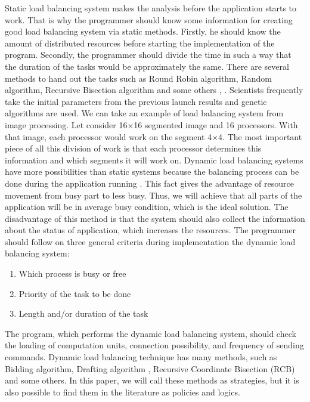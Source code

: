 Static load balancing system makes the analysis before the application starts to work. That is why the programmer should know some information for creating good load balancing system via static methods. Firstly, he should know the amount of distributed resources before starting the implementation of the program. Secondly, the programmer should divide the time in such a way that the duration of the tasks would be approximately the same. There are several methods to hand out the tasks such as Round Robin algorithm, Random algorithm, Recursive Bisection algorithm and some others \cite{oper_sys_conc}, \cite{perf_dlba}. Scientists frequently take the initial parameters from the previous launch results and genetic algorithms are used. We can take an example of load balancing system from image processing. Let consider 16$\times$16 segmented image and 16 processors. With that image, each processor would work on the segment 4$\times$4. The most important piece of all this division of work is that each processor determines this information and which segments it will work on.
\newpage
Dynamic load balancing systems have more possibilities than static systems because the balancing process can be done during the application running \cite{guide_dyn_bal}. This fact gives the advantage of resource movement from busy part to less busy. Thus, we will achieve that all parts of the application will be in average busy condition, which is the ideal solution. The disadvantage of this method is that the system should also collect the information about the status of application, which increases the resources. The programmer should follow on three general criteria during implementation the dynamic load balancing system:
\begin{enumerate}%
	\setlength{\itemsep}{-2mm}
	\item Which process is busy or free 
	\item Priority of the task to be done 
	\item Length and/or duration of the task
\end{enumerate}
The program, which performs the dynamic load balancing system, should check the loading of computation units, connection possibility, and frequency of sending commands. Dynamic load balancing technique has many methods, such as Bidding algorithm, Drafting algorithm \cite{draft_alg}, Recursive Coordinate Bisection (RCB) and some others. In this paper, we will call these methods as strategies, but it is also possible to find them in the literature as policies and logics.

